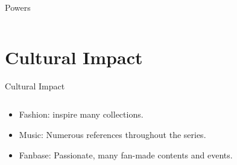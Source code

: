 \documentclass[presentation]{beamer}
\begin{document}
\begin{frame}{Powers}
\begin{columns}[T]
\begin{column}{0.55\textwidth}
			
		\end{column}
		
	\end{columns}
\end{frame}
\section{Cultural Impact}

\begin{frame}{Cultural Impact}
	\begin{columns}[T]
		
		
		\begin{column}{0.45\textwidth}
			\begin{itemize}
				\item<1-> Fashion: inspire many collections.
				\vspace{1.5em}
				\item<1->
				Music: Numerous references throughout the series.
				\vspace{1.7em}
				\item<2->Fanbase: Passionate, many fan-made contents and events.
			\end{itemize}
		\end{column}
		
		\begin{column}{0.55\textwidth}
			\centering
			      

\end{column}
\end{columns}
\end{frame}
\end{document}
